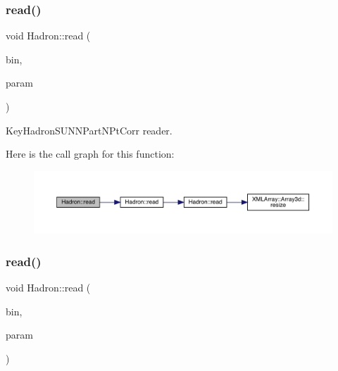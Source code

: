 \subsubsection{\texorpdfstring{read()}{read()}\hspace{0.1cm}{\footnotesize\ttfamily [53/94]}}
{\footnotesize\ttfamily void Hadron\+::read (\begin{DoxyParamCaption}\item[{\mbox{\hyperlink{classADATIO_1_1BinaryReader}{Binary\+Reader}} \&}]{bin,  }\item[{\mbox{\hyperlink{structHadron_1_1KeyHadronSUNNPartNPtCorr__t}{Key\+Hadron\+S\+U\+N\+N\+Part\+N\+Pt\+Corr\+\_\+t}} \&}]{param }\end{DoxyParamCaption})}



Key\+Hadron\+S\+U\+N\+N\+Part\+N\+Pt\+Corr reader. 

Here is the call graph for this function\+:\nopagebreak
\begin{figure}[H]
\begin{center}
\leavevmode
\includegraphics[width=350pt]{d1/daf/namespaceHadron_a475e00d642e0578e7bbe956bbbf37aac_cgraph}
\end{center}
\end{figure}
\mbox{\label{namespaceHadron_a60758467521910899dec197e7fbc0ab4}} 
\subsubsection{\texorpdfstring{read()}{read()}\hspace{0.1cm}{\footnotesize\ttfamily [54/94]}}
{\footnotesize\ttfamily void Hadron\+::read (\begin{DoxyParamCaption}\item[{\mbox{\hyperlink{classADATIO_1_1BinaryReader}{Binary\+Reader}} \&}]{bin,  }\item[{\mbox{\hyperlink{structHadron_1_1KeyHadronNode__t_1_1Quark__t}{Key\+Hadron\+Node\+\_\+t\+::\+Quark\+\_\+t}} \&}]{param }\end{DoxyParamCaption})}




